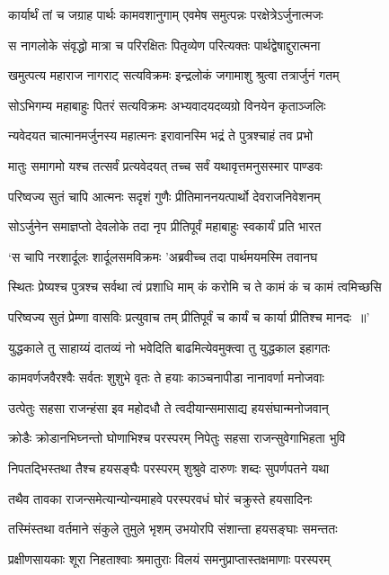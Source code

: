 \twolineshloka
{कार्यार्थं तां च जग्राह पार्थः कामवशानुगाम्}
{एवमेष समुत्पन्नः परक्षेत्रेऽर्जुनात्मजः}


\twolineshloka
{स नागलोके संवृद्धो मात्रा च परिरक्षितः}
{पितृव्येण परित्यक्तः पार्थद्वेषाद्दुरात्मना}


\twolineshloka
{खमुत्पत्य महाराज नागराट् सत्यविक्रमः}
{इन्द्रलोकं जगामाशु श्रुत्वा तत्रार्जुनं गतम्}


\twolineshloka
{सोऽभिगम्य महाबाहुः पितरं सत्यविक्रमः}
{अभ्यवादयदव्यग्रो विनयेन कृताञ्जलिः}


\twolineshloka
{न्यवेदयत चात्मानमर्जुनस्य महात्मनः}
{इरावानस्मि भद्रं ते पुत्रश्चाहं तव प्रभो}


\twolineshloka
{मातुः समागमो यश्च तत्सर्वं प्रत्यवेदयत्}
{तच्च सर्वं यथावृत्तमनुसस्मार पाण्डवः}


\twolineshloka
{परिष्वज्य सुतं चापि आत्मनः सदृशं गुणैः}
{प्रीतिमाननयत्पार्थो देवराजनिवेशनम्}


\twolineshloka
{सोऽर्जुनेन समाज्ञप्तो देवलोके तदा नृप}
{प्रीतिपूर्वं महाबाहुः स्वकार्यं प्रति भारत}


\twolineshloka
{`स चापि नरशार्दूलः शार्दूलसमविक्रमः}
{'अब्रवीच्च तदा पार्थमयमस्मि तवानघ}


\twolineshloka
{स्थितः प्रेष्यश्च पुत्रश्च सर्वथा त्वं प्रशाधि माम्}
{कं करोमि च ते कामं कं च कामं त्वमिच्छसि}


\twolineshloka
{परिष्वज्य सुतं प्रेम्णा वासविः प्रत्युवाच तम्}
{प्रीतिपूर्वं च कार्यं च कार्या प्रीतिश्च मानदः ॥'}


\twolineshloka
{युद्धकाले तु साहाय्यं दातव्यं नो भवेदिति}
{बाढमित्येवमुक्त्वा तु युद्धकाल इहागतः}


\twolineshloka
{कामवर्णजवैरश्वैः सर्वतः शुशुभे वृतः}
{ते हयाः काञ्चनापीडा नानावर्णा मनोजवाः}


\twolineshloka
{उत्पेतुः सहसा राजन्हंसा इव महोदधौ}
{ते त्वदीयान्समासाद्य हयसंघान्मनोजवान्}


\twolineshloka
{क्रोडैः क्रोडानभिघ्नन्तो घोणाभिश्च परस्परम्}
{निपेतुः सहसा राजन्सुवेगाभिहता भुवि}


\twolineshloka
{निपतद्भिस्तथा तैश्च हयसङ्घैः परस्परम्}
{शुश्रुवे दारुणः शब्दः सुपर्णपतने यथा}


\twolineshloka
{तथैव तावका राजन्समेत्यान्योन्यमाहवे}
{परस्परवधं घोरं चक्रुस्ते हयसादिनः}


\twolineshloka
{तस्मिंस्तथा वर्तमाने संकुले तुमुले भृशम्}
{उभयोरपि संशान्ता हयसङ्घाः समन्ततः}


\twolineshloka
{प्रक्षीणसायकाः शूरा निहताश्वाः श्रमातुराः}
{विलयं समनुप्राप्तास्तक्षमाणाः परस्परम्}


